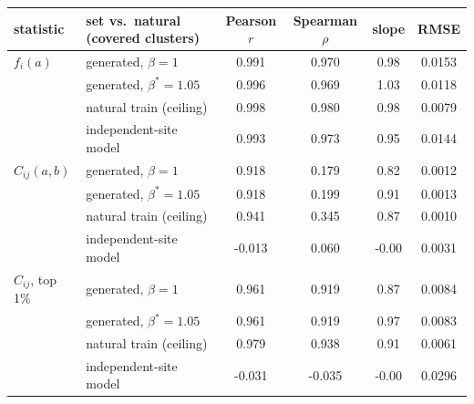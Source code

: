 \begin{tabular}{llcccc}
\toprule
statistic & set vs.\ natural (covered clusters) & Pearson $r$ & Spearman $\rho$ & slope & RMSE \\
\midrule
$f_i(a)$ & generated, $\beta=1$ & 0.991 & 0.970 & 0.98 & 0.0153 \\
 & generated, $\beta^*=1.05$ & 0.996 & 0.969 & 1.03 & 0.0118 \\
 & natural train (ceiling) & 0.998 & 0.980 & 0.98 & 0.0079 \\
 & independent-site model & 0.993 & 0.973 & 0.95 & 0.0144 \\
\midrule
$C_{ij}(a,b)$ & generated, $\beta=1$ & 0.918 & 0.179 & 0.82 & 0.0012 \\
 & generated, $\beta^*=1.05$ & 0.918 & 0.199 & 0.91 & 0.0013 \\
 & natural train (ceiling) & 0.941 & 0.345 & 0.87 & 0.0010 \\
 & independent-site model & -0.013 & 0.060 & -0.00 & 0.0031 \\
\midrule
$C_{ij}$, top 1\% & generated, $\beta=1$ & 0.961 & 0.919 & 0.87 & 0.0084 \\
 & generated, $\beta^*=1.05$ & 0.961 & 0.919 & 0.97 & 0.0083 \\
 & natural train (ceiling) & 0.979 & 0.938 & 0.91 & 0.0061 \\
 & independent-site model & -0.031 & -0.035 & -0.00 & 0.0296 \\
\bottomrule
\end{tabular}